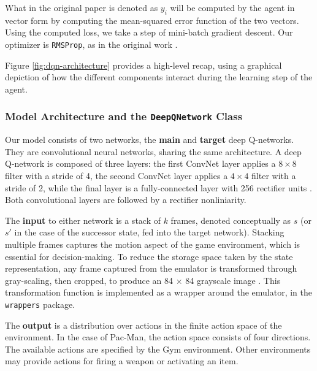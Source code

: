 What in the original paper is denoted as $y_i$ will be computed by the agent in vector form by computing the mean-squared error function of the two vectors.
Using the computed loss, we take a step of mini-batch gradient descent.
Our optimizer is \verb|RMSProp|, as in the original work \cite{atari-dqn}.

Figure \ref{fig:dqn-architecture} provides a high-level recap, using a graphical depiction of how the different components interact during the learning step of the agent.


\subsubsection{Model Architecture and the \texttt{DeepQNetwork} Class} \label{section:model-arch}


Our model consists of two networks, the \textbf{main} and \textbf{target} deep Q-networks.
They are convolutional neural networks, sharing the same architecture.
A deep Q-network is composed of three layers: the first ConvNet layer applies a $8 \times 8$ filter with a stride of 4, the second ConvNet layer applies a $4 \times 4$ filter with a stride of 2, while the final layer is a fully-connected layer with 256 rectifier units \cite{atari-dqn}.
Both convolutional layers are followed by a rectifier nonliniarity.

The \textbf{input} to either network is a stack of $k$ frames, denoted conceptually as $s$ (or $s'$ in the case of the successor state, fed into the target network).
Stacking multiple frames captures the motion aspect of the game environment, which is essential for decision-making.
To reduce the storage space taken by the state representation, any frame captured from the emulator is transformed through gray-scaling, then cropped, to produce an 84 $\times$ 84 grayscale image \cite{atari-dqn}.
This transformation function is implemented as a wrapper around the emulator, in the \texttt{wrappers} package.

The \textbf{output} is a distribution over actions in the finite action space of the environment.
In the case of Pac-Man, the action space consists of four directions.
The available actions are specified by the Gym environment.
Other environments may provide actions for firing a weapon or activating an item.

